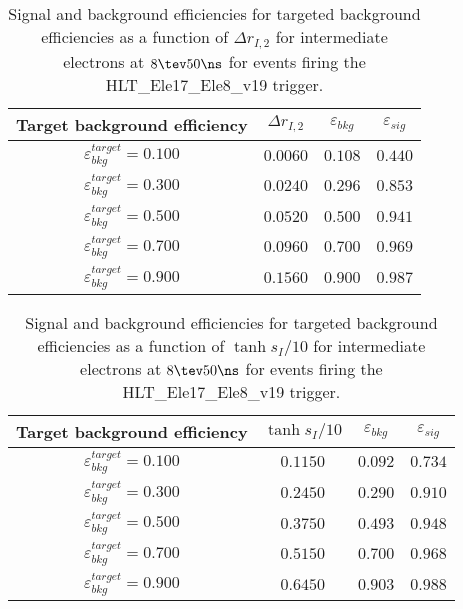 \clearpage

\begin{table}[!bht]
  \begin{center}
    \begin{tabular}{cccc}
      \hline
      Target background efficiency & $\Delta r_{I,2}$ & $\varepsilon_{bkg}$ & $\varepsilon_{sig}$ \\ 
      \hline
      $\varepsilon_{bkg}^{target} = 0.100$ & $  0.0060$ & $0.108$ & $0.440$ \\
      $\varepsilon_{bkg}^{target} = 0.300$ & $  0.0240$ & $0.296$ & $0.853$ \\
      $\varepsilon_{bkg}^{target} = 0.500$ & $  0.0520$ & $0.500$ & $0.941$ \\
      $\varepsilon_{bkg}^{target} = 0.700$ & $  0.0960$ & $0.700$ & $0.969$ \\
      $\varepsilon_{bkg}^{target} = 0.900$ & $  0.1560$ & $0.900$ & $0.987$ \\
      \hline
    \end{tabular}
    \caption{Signal and background efficiencies for targeted background efficiencies as a function of $\Delta r_{I,2}$ for intermediate electrons at $8\tev 50\ns$ for events firing the HLT\_Ele17\_Ele8\_v19 trigger.}
    \label{tab:eff_rej_r2I_beam_8_50_trigger_17_8_I}
  \end{center}
\end{table}

\clearpage

\begin{table}[!bht]
  \begin{center}
    \begin{tabular}{cccc}
      \hline
      Target background efficiency & $\tanh{s_I/10}$ & $\varepsilon_{bkg}$ & $\varepsilon_{sig}$ \\ 
      \hline
      $\varepsilon_{bkg}^{target} = 0.100$ & $  0.1150$ & $0.092$ & $0.734$ \\
      $\varepsilon_{bkg}^{target} = 0.300$ & $  0.2450$ & $0.290$ & $0.910$ \\
      $\varepsilon_{bkg}^{target} = 0.500$ & $  0.3750$ & $0.493$ & $0.948$ \\
      $\varepsilon_{bkg}^{target} = 0.700$ & $  0.5150$ & $0.700$ & $0.968$ \\
      $\varepsilon_{bkg}^{target} = 0.900$ & $  0.6450$ & $0.903$ & $0.988$ \\
      \hline
    \end{tabular}
    \caption{Signal and background efficiencies for targeted background efficiencies as a function of $\tanh{s_I/10}$ for intermediate electrons at $8\tev 50\ns$ for events firing the HLT\_Ele17\_Ele8\_v19 trigger.}
    \label{tab:eff_rej_sI_beam_8_50_trigger_17_8_I}
  \end{center}
\end{table}

